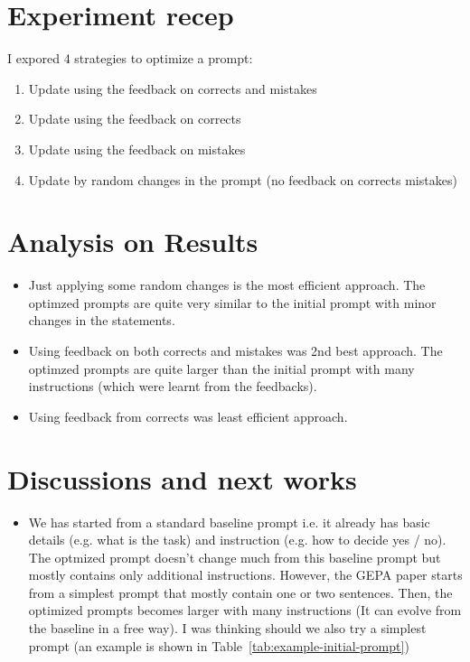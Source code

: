 \documentclass[12pt]{article}
\begin{document}
\section{Experiment recep} I expored 4 strategies to optimize a prompt:
\begin{enumerate}
    \item Update using the feedback on corrects and mistakes
    \item Update using the feedback on corrects 
    \item Update using the feedback on mistakes
    \item Update by random changes in the prompt (no feedback on corrects mistakes) 
\end{enumerate}

\section{Analysis on Results} 
\begin{itemize}
    \item Just applying some random changes is the most efficient approach. The optimzed prompts are quite very similar to the initial prompt with minor changes in the statements.
    \item Using feedback on both corrects and mistakes was 2nd best approach. The optimzed prompts are quite larger than the initial prompt with many instructions (which were learnt from the feedbacks).
    \item Using feedback from corrects was least efficient approach.
\end{itemize}

\section{Discussions and next works}
\begin{itemize}
    \item We has started from a standard baseline prompt i.e. it already has basic details (e.g. what is the task) and instruction (e.g. how to decide yes / no).
    The optmized prompt doesn't change much from this baseline prompt but mostly contains only additional instructions.
    However, the GEPA paper starts from a simplest prompt that mostly contain one or two sentences. Then, the optimized prompts becomes larger with many instructions (It can evolve from the baseline in a free way).
    I was thinking should we also try a simplest prompt (an example is shown in Table~\ref{tab:example-initial-prompt})
\end{itemize}
\end{document}
